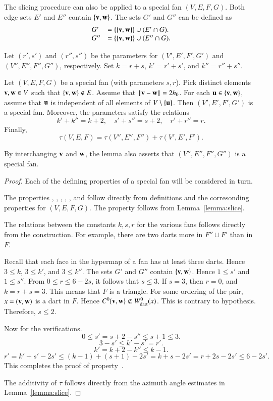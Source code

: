 The slicing procedure can also be applied to a special fan $(V,E,F,G)$.
Both edge sets $E'$ and $E''$ contain $\{{\mathbf v},{\mathbf w}\}$.  The sets $G'$ and $G''$ can be defined
as 
$$
\begin{array}{lll}
G' &= \{\{{\mathbf v},{\mathbf w}\}\} \cup (E'\cap G).\\
G'' &= \{\{{\mathbf v},{\mathbf w}\}\} \cup (E''\cap G).\\
\end{array}
$$ 

Let $(r',s')$ and $(r'',s'')$ be the parameters for $(V',E',F',G')$ and $(V'',E'',F'',G'')$, respectively.
Set $k=r+s$, $k'=r'+s'$, and $k''=r''+s''$.

\begin{lemma}  Let $(V,E,F,G)$ be a special fan (with parameters $s,r$).  
Pick distinct elements ${\mathbf v},{\mathbf w}\in V$  such that $\{{\mathbf v},{\mathbf w}\}\not\in E$.
Assume that ${\hskip0.1em|\hskip-0.15em|\hskip0.1em}{\mathbf v} - {\mathbf w}{\hskip0.1em|\hskip-0.15em|\hskip0.1em}=2{h_0}$.
For each ${\mathbf u}\in \{{\mathbf v},{\mathbf w}\}$, assume that ${\mathbf u}$ is independent of all elements of $V\setminus\{{\mathbf u}\}$.    
Then $(V',E',F',G')$ is a special fan.  Moreover,
the parameters satisfy the relations
$$
k'+k'' = k + 2,\quad s'+s'' = s + 2,\quad r'+r''=r.
$$
Finally,
$$
\tau(V,E,F)= \tau(V'',E'',F'') +\tau(V',E',F').
$$
\end{lemma}

By interchanging ${\mathbf v}$ and ${\mathbf w}$, the lemma also asserts that $(V'',E'',F'',G'')$ is a special fan.

\begin{proof}  Each of the defining properties of a special fan will be considered in turn.

The properties , , , , , and  follow directly from definitions and the corresonding properties for $(V,E,F,G)$.
The property  follows from Lemma~\ref{lemma:slice}.

The relations between the constants $k,s,r$ for the various fans follows directly from the construction.
For example, there are two darts more in $F''\cup F'$ than in $F$.  

  Recall that each face in the hypermap of a fan has at least three darts.  Hence $3\le k$, $3\le k'$, and $3\le k''$.
The sets $G'$ and $G''$ contain $\{{\mathbf v},{\mathbf w}\}$.  Hence $1\le s'$ and $1\le s''$.
From $0\le r\le 6 - 2s$, it follows that $s\le 3$.  If $s=3$, then $r=0$, and $k=r+s=3$.  This means that $F$ is a triangle.  For some ordering of the pair, $x=({\mathbf v},{\mathbf w})$ is a dart in $F$.
Hence  $C^0\{{\mathbf v},{\mathbf w}\} \not\subset W^0_{\text{dart}}(x)$.  This is contrary to hypothesis.  Therefore, $s\le 2$.

Now for the verifications.
$$0\le s' = s + 2 - s'' \le s+1\le 3.$$
$$3-s'\le k'-s' = r'.$$
$$k' = k + 2 - k'' \le k-1.$$
$$
r'= k'+s' - 2 s' \le (k-1) + (s+1) - 2s' =k+s - 2s' = r + 2s -2s' \le 6 - 2s'.
$$
This completes the proof of property~.

The additivity of $\tau$ follows directly from the azimuth angle estimates in Lemma~\ref{lemma:slice}.
\end{proof}



